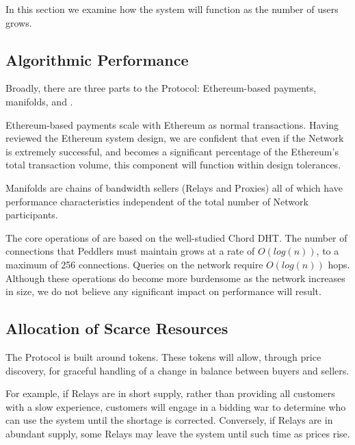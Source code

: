 
In this section we examine how the system will function as the
number of users grows.

\subsection{Algorithmic Performance}

Broadly, there are three parts to the \Orchid{} Protocol: Ethereum-based
payments, manifolds, and \tOM{}.

Ethereum-based payments scale with Ethereum as normal transactions.
Having reviewed the Ethereum system design, we are confident that even
if the \Orchid{} Network is extremely successful, and becomes a
significant percentage of the Ethereum's total transaction volume,
this component will function within design tolerances.

Manifolds are chains of bandwidth sellers (Relays and Proxies)
all of which have performance characteristics independent of the total number of
\Orchid{} Network participants.

The core operations of \tOM{} are based on the well-studied Chord
DHT. The number of connections that Peddlers must maintain grows at a
rate of $O(log{}(n))$, to a maximum of 256 connections. Queries on the
network require $O(log{}(n))$ hops. Although these operations do become
more burdensome as the network increases in size, we do not believe
any significant impact on performance will result.

\subsection{Allocation of Scarce Resources}

The \Orchid{} Protocol is built around tokens. These tokens will allow,
through price discovery, for graceful handling of a change in balance
between buyers and sellers.

For example, if Relays are in short supply, rather than providing all
customers with a slow experience, customers will engage in a bidding
war to determine who can use the system until the shortage is
corrected. Conversely, if Relays are in abundant supply, some Relays
may leave the system until such time as prices rise.

